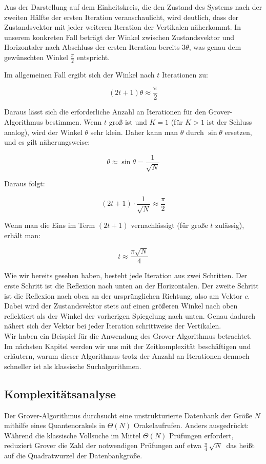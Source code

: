 Aus der Darstellung auf dem Einheitskreis, die den Zustand des Systems nach der zweiten Hälfte der ersten Iteration veranschaulicht, wird deutlich, dass der Zustandsvektor mit jeder weiteren Iteration der Vertikalen näherkommt. In unserem konkreten Fall beträgt der Winkel zwischen Zustandsvektor und Horizontaler nach Abschluss der ersten Iteration bereits $3\theta$, was genau dem gewünschten Winkel $\frac{\pi}{2}$ entspricht.

Im allgemeinen Fall ergibt sich der Winkel nach $t$ Iterationen zu:

$$
(2t + 1)\theta \approx \frac{\pi}{2}
$$

Daraus lässt sich die erforderliche Anzahl an Iterationen für den Grover-Algorithmus bestimmen. Wenn $t$ groß ist und $K = 1$ (für $K > 1$ ist der Schluss analog), wird der Winkel $\theta$ sehr klein. Daher kann man $\theta$ durch $\sin{\theta}$ ersetzen, und es gilt näherungsweise:

$$
\theta \approx \sin{\theta} = \frac{1}{\sqrt{N}}
$$

Daraus folgt:

$$
(2t + 1) \cdot \frac{1}{\sqrt{N}} \approx \frac{\pi}{2}
$$

Wenn man die Eins im Term $(2t + 1)$ vernachlässigt (für große $t$ zulässig), erhält man:

$$
t \approx \frac{\pi \sqrt{N}}{4}
$$

Wie wir bereits gesehen haben, besteht jede Iteration aus zwei Schritten. Der erste Schritt ist die Reflexion nach unten an der Horizontalen. Der zweite Schritt ist die Reflexion nach oben an der ursprünglichen Richtung, also am Vektor $c$. Dabei wird der Zustandsvektor stets auf einen größeren Winkel nach oben reflektiert als der Winkel der vorherigen Spiegelung nach unten. Genau dadurch nähert sich der Vektor bei jeder Iteration schrittweise der Vertikalen.\\

Wir haben ein Beispiel für die Anwendung des Grover-Algorithmus betrachtet. Im nächsten Kapitel werden wir uns mit der Zeitkomplexität beschäftigen und erläutern, warum dieser Algorithmus trotz der Anzahl an Iterationen dennoch schneller ist als klassische Suchalgorithmen.


\subsection{Komplexitätsanalyse}
Der Grover‐Algorithmus durchsucht eine unstrukturierte Datenbank der Größe \(N\) mithilfe eines Quantenorakels in \(\Theta(N)\) Orakelaufrufen. Anders ausgedrückt: Während die klassische Vollsuche im Mittel \(\Theta(N)\) Prüfungen erfordert, reduziert Grover die Zahl der notwendigen Prüfungen auf etwa $\frac{\pi}{4}\,\sqrt{N}\ $ das heißt auf die Quadratwurzel der Datenbankgröße.

